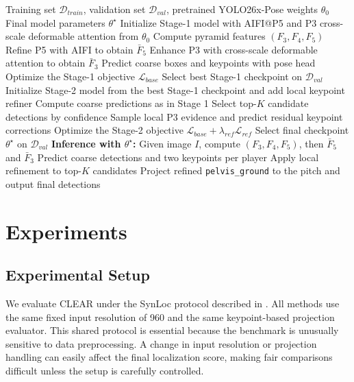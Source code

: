 \documentclass[runningheads]{llncs}
\begin{document}
\begin{algorithm}[t]
\caption{Training and Inference of CLEAR}
\label{alg:clear}
\begin{algorithmic}[1]
\Require Training set $\mathcal{D}_{train}$, validation set $\mathcal{D}_{val}$, pretrained YOLO26x-Pose weights $\theta_0$
\Ensure Final model parameters $\theta^{\star}$
\State Initialize Stage-1 model with AIFI@P5 and P3 cross-scale deformable attention from $\theta_0$
        \State Compute pyramid features $(F_3,F_4,F_5)$
        \State Refine P5 with AIFI to obtain $\bar{F}_5$
        \State Enhance P3 with cross-scale deformable attention to obtain $\bar{F}_3$
        \State Predict coarse boxes and keypoints with pose head
        \State Optimize the Stage-1 objective $\mathcal{L}_{base}$
    \EndFor
\EndFor
\State Select best Stage-1 checkpoint on $\mathcal{D}_{val}$
\State Initialize Stage-2 model from the best Stage-1 checkpoint and add local keypoint refiner
        \State Compute coarse predictions as in Stage 1
        \State Select top-$K$ candidate detections by confidence
        \State Sample local P3 evidence and predict residual keypoint corrections
        \State Optimize the Stage-2 objective $\mathcal{L}_{base}+\lambda_{ref}\mathcal{L}_{ref}$
    \EndFor
\EndFor
\State Select final checkpoint $\theta^{\star}$ on $\mathcal{D}_{val}$
\Statex
\Statex \textbf{Inference with $\theta^{\star}$:}
\State Given image $I$, compute $(F_3,F_4,F_5)$, then $\bar{F}_5$ and $\bar{F}_3$
\State Predict coarse detections and two keypoints per player
\State Apply local refinement to top-$K$ candidates
\State Project refined \texttt{pelvis\_ground} to the pitch and output final detections
\end{algorithmic}
\end{algorithm}

\section{Experiments}
\label{sec:experiments}

\subsection{Experimental Setup}
\label{sec:exp-setup}

We evaluate CLEAR under the SynLoc protocol described in . All methods use the same fixed input resolution of 960 and the same keypoint-based projection evaluator. This shared protocol is essential because the benchmark is unusually sensitive to data preprocessing. A change in input resolution or projection handling can easily affect the final localization score, making fair comparisons difficult unless the setup is carefully controlled.
\end{document}
